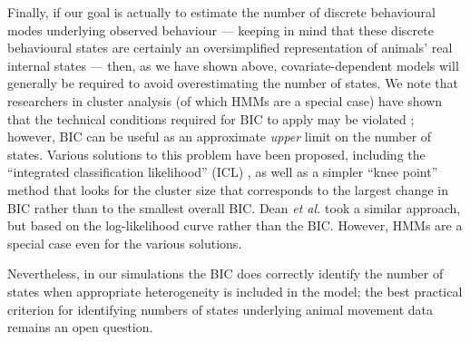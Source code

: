 \documentclass{bmcart}
\begin{document}
Finally, if our goal is actually to estimate the number of discrete
behavioural modes underlying observed behaviour --- keeping in mind
that these discrete behavioural states are certainly an oversimplified
representation of animals' real internal states --- then, as we have
shown above, covariate-dependent models will generally be required to
avoid overestimating the number of states.  We note that researchers
in cluster analysis (of which HMMs are a special case) have shown that
the technical conditions required for BIC to apply may be violated
\cite{biernacki2000assessing}; however, BIC can be useful as an
approximate \emph{upper} limit on the number of states. Various
solutions to this problem have been proposed, including the
``integrated classification likelihood'' (ICL)
\cite{biernacki2000assessing,celeux2008selecting}, as well as a simpler ``knee point''
method \cite{zhao_knee_2008} that looks for the cluster size that
corresponds to the largest change in BIC rather than to the smallest
overall BIC.  Dean \emph{et al.} \cite{dean2012behavioural} took a similar approach, but
based on the log-likelihood curve rather than the BIC. However, HMMs are 
a special case even for the various solutions. 

Nevertheless, in our simulations the BIC does correctly identify
the number of states when appropriate heterogeneity is included
in the model; the best practical criterion for identifying 
numbers of states underlying animal movement data remains an open question.
\end{document}
